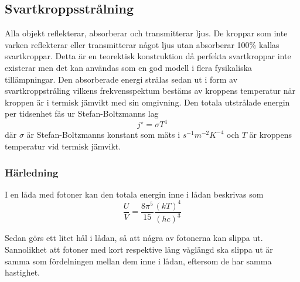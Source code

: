 \subsection{Svartkroppsstrålning}

Alla objekt reflekterar, absorberar och transmitterar ljus. De kroppar som inte varken reflekterar eller transmitterar något ljus utan absorberar 100\% kallas svartkroppar. Detta är en teorektisk konstruktion då perfekta svartkroppar inte existerar men det kan användas som en god modell i flera fysikaliska tillämpningar. Den absorberade energi strålas sedan ut i form av svartkroppstråling vilkens frekvensspektum bestäms av kroppens temperatur när kroppen är i termisk jämvikt med sin omgivning. Den totala utstrålade energin per tidsenhet fås ur Stefan-Boltzmanns lag
\begin{equation}
j^{\star} = \sigma T^{4}
\end{equation}
\noindent
där $\sigma$ är Stefan-Boltzmanns konstant som mäts i $\unit{s^{-1}m^{-2}K^{-4}}$ och $T$ är kroppens temperatur vid termisk jämvikt.

\subsubsection{Härledning}
I en låda med fotoner kan den totala energin inne i lådan beskrivas som 
\begin{equation}
\frac{U}{V}=\frac{8\pi^5}{15}\frac{(kT)^4}{(hc)^3}
\end{equation}


Sedan görs ett litet hål i lådan, så att några av fotonerna kan slippa ut. Sannolikhet att fotoner med kort respektive lång våglängd ska slippa ut är samma som fördelningen mellan dem inne i lådan, eftersom de har samma hastighet.

